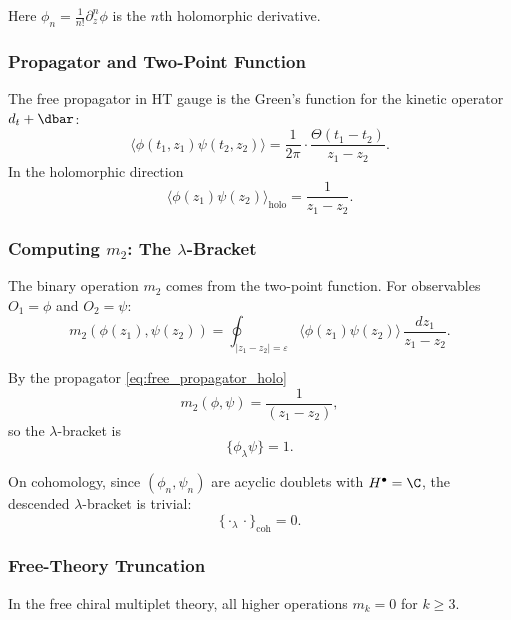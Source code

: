 Here $\phi_n = \frac{1}{n!} \partial_z^n \phi$ is the $n$th holomorphic derivative.
\subsubsection{Propagator and Two-Point Function}
The free propagator in HT gauge is the Green's function for the kinetic operator $d_t + \dbar$:
\begin{equation}
\label{eq:free_propagator}
\langle \phi(t_1, z_1) \psi(t_2, z_2) \rangle = \frac{1}{2\pi} \cdot \frac{\Theta(t_1 - t_2)}{z_1 - z_2}.
\end{equation}
In the holomorphic direction
\begin{equation}
\label{eq:free_propagator_holo}
\langle \phi(z_1) \psi(z_2) \rangle_{\text{holo}} = \frac{1}{z_1 - z_2}.
\end{equation}

\subsubsection{Computing $m_2$: The $\lambda$-Bracket}
The binary operation $m_2$ comes from the two-point function. For observables $O_1 = \phi$ and $O_2 = \psi$:
\begin{equation}
m_2(\phi(z_1), \psi(z_2)) = \oint_{|z_1 - z_2| = \varepsilon} \langle \phi(z_1) \psi(z_2) \rangle \, \frac{dz_1}{z_1 - z_2}.
\end{equation}

By the propagator \eqref{eq:free_propagator_holo}
\begin{equation}
m_2(\phi, \psi) = \frac{1}{(z_1 - z_2)},
\end{equation}
so the $\lambda$-bracket is
\begin{equation}
\label{eq:free_lambda_bracket}
\{\phi_\lambda \psi\} = 1.
\end{equation}

On cohomology, since $(\phi_n, \psi_n)$ are acyclic doublets with $H^\bullet = \C$, the descended $\lambda$-bracket is trivial:
\begin{equation}
\{\cdot_\lambda \cdot\}_{\text{coh}} = 0.
\end{equation}

\subsubsection{Free-Theory Truncation}

\begin{proposition}[All $m_{k \geq 3} = 0$ for Free Theory]
\label{prop:free_higher_vanish}
In the free chiral multiplet theory, all higher operations $m_k = 0$ for $k \geq 3$.
\end{proposition}

